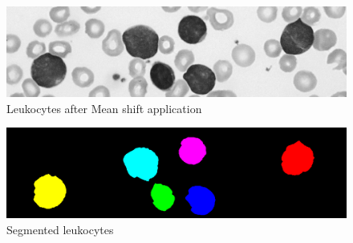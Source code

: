 \bigskip
\begin{figure}
\begin{center}
		\includegraphics[scale=0.3]{img/final/nooverlap.png}
		\caption{Leukocytes after Mean shift application}
		\label{fig:noover}
\end{center}
\end{figure}
\begin{figure}
\begin{center}
		\includegraphics[scale=0.3]{img/final/nooverlapseg.png}
		\caption{Segmented leukocytes}
		\label{fig:nooverseg}
\end{center}
\end{figure}

